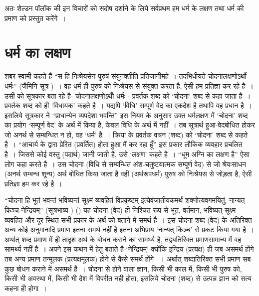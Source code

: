 अतः शेल्डन पॉलॉक की इन विचारों को सदोष दर्शाने के लिये सर्वप्रथम हम धर्म के लक्षण तथा धर्म की प्रमाण को प्रस्तुत करेंगे~।\\[-1cm]



\section*{धर्म का लक्षण}

शबर स्वामी कहते हैं “स हि निःश्रेयसेन पुरुषं संयुनक्तीति प्रतिजानीमहे~। तदभिधीयते-चोदनालक्षणोऽर्थो धर्मः” (जैमिनि सूत्र )~। वह धर्म ही पुरुष को निःश्रेयस से संयुक्त करता है, ऐसी हम प्रतिज्ञा कर रहे है~। उसी को सूत्रकार बता रहे है- चोदनालक्षणोऽर्थोे धर्मः - प्रवर्तक शब्द को ‘चोदना' शब्द से कहा जाता है~। प्रवर्तक शब्द को ही ‘विधायक' कहते है~। यद्यपि ‘विधि' सम्पूर्ण वेद का एकदेश है तथापि वह प्रधान है~। इसलिये सूत्रकार ने “प्राधान्येन व्यपदेशा भवन्ति” इस नियम के अनुसार उक्त धर्मलक्षण में ‘चोदना' शब्द का प्रयोग ‘सम्पूर्ण वेद' के अर्थ में किया है, केवल विधि के अर्थ में नहीं~। तब सूत्रार्थ हुआ-वेदबोधित होकर जो अनर्थ से सम्बन्धित न हो, वह ‘धर्म' है~। क्रिया के प्रवर्तक वचन (शब्द) को ‘चोदना' शब्द से कहते है~। “आचार्य के द्वारा प्रेरित (प्रवर्तित) होता हुआ मैं कर रहा हूँ” इस प्रकार लौकिक व्यवहार प्रचलित है~। जिससे कोई वस्तु (पदार्थ) जानी जाती है, उसे ‘लक्षण' कहते है~। “धूम अग्नि का लक्षण है” ऐसा लोग कहा करते है~। उस चोदना (विधि से सम्बन्धित अंश-चतुष्टयात्मक सम्पूर्ण वेद) से जो श्रेयःसाधन (अनर्थ सम्बन्ध शून्य) अर्थ बोधित किया जाता है वही (अर्थरूपधर्म) पुरुष को निःश्रेयस से जोड़ता है, ऐसी प्रतिज्ञा हम कर रहे है~।

“चोदना हि भूतं भवन्तं भविष्यन्तं सूक्ष्मं व्यवहितं विप्रकृष्टम् इत्येवंजातीयकमर्थं शक्नोत्य\-वगमयितुं, नान्यत् किञ्च नेन्द्रियम्” (सूत्रभाष्य ) () यह चोदना (वेद) ही निश्चित रूप से भूत, वर्तमान, भविष्यत् सूक्ष्म व्यवहित और दूर स्थित सभी प्रकार के अर्थ को बताने में समर्थ है~। इस चोदना शब्द (वेद) के अतिरिक्त अन्य कोई अनुमानादि प्रमाण इतना समर्थ नहीं है इतना अभिप्राय ‘नान्यत् किञ्च' से प्रकट किया गया है~। अर्थात् शब्द प्रमाण में ही तादृश अर्थ के बोधन कराने का सामर्थ्य है, तद्व्यतिरिक्त प्रमाणसामान्य में वह सामर्थ्य नहीं है~। अपने इस कथन में हेतु बताते है-‘नेन्द्रियम्'-क्योंकि इन्द्रिय (प्रत्यक्ष) ही जब असमर्थ होंगे तब अन्य प्रमाण तन्मूलक (प्रत्यक्षमूलक) होने से कैसे समर्थ होंगे ~। अर्थात् शब्दातिरिक्त सभी प्रमाण सब कुछ बोधन कराने में असमर्थ है~। चोदना से होने वाला ज्ञान, किसी भी काल में, किसी भी पुरुष को, किसी भी अवस्था में, किसी भी देश में विपरीत नही होता, इसलिये चोदना (शब्द) से उत्पन्न ज्ञान को सत्य कहना ही होगा~। 

